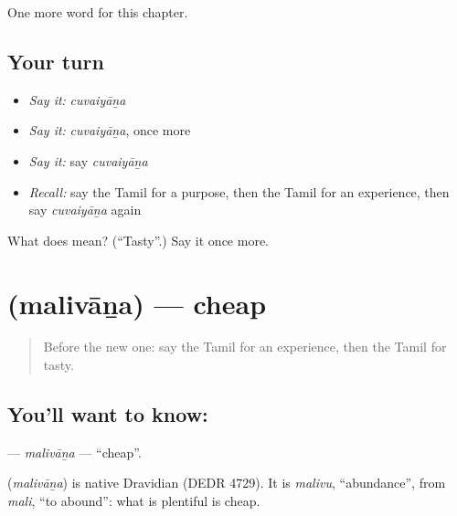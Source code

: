 \begin{grammarlens}[title={What you've built}]
One more word for this chapter.
\end{grammarlens}

\subsection*{Your turn}
\begin{itemize}
\raggedright
  \item \emph{Say it:} \emph{cuvaiyāṉa}
  \item \emph{Say it:} \emph{cuvaiyāṉa}, once more
  \item \emph{Say it:} say \emph{cuvaiyāṉa}
  \item \emph{Recall:} say the Tamil for a purpose, then the Tamil for an experience, then say \emph{cuvaiyāṉa} again
\end{itemize}

\begin{tcolorbox}[breakable,colback=teal!4,colframe=teal!35!black,title={Before you move on}]
What does  mean? (\textquotedblleft{}Tasty\textquotedblright{}.) Say it once more.
\end{tcolorbox}
\section[\texorpdfstring{\ta{மலிவான} (malivāṉa)}{மலிவான (malivāṉa)}]{ (malivāṉa) — cheap}

\label{lesson:TA-C178-malivana}



\begin{quote}
Before the new one: say the Tamil for an experience, then the Tamil for tasty.
\end{quote}

\subsection*{You'll want to know: }
\textbf{} — \emph{malivāṉa} — \textquotedblleft{}cheap\textquotedblright{}.

\begin{cousinweb}
\textbf{} (\emph{malivāṉa}) is native Dravidian (DEDR 4729). It is \emph{malivu}, \textquotedblleft{}abundance\textquotedblright{}, from \emph{mali}, \textquotedblleft{}to abound\textquotedblright{}: what is plentiful is cheap.
\end{cousinweb}

